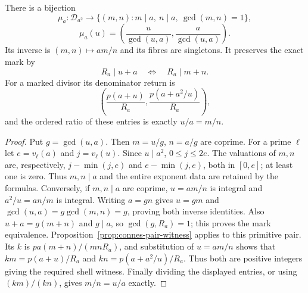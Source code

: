 \begin{proposition}
\label{prop:connes-middle-return}
There is a bijection
\[
 \mu_a:\mathcal D_{a^2}\longrightarrow
 \{(m,n):m\mid a,\ n\mid a,\ \gcd(m,n)=1\},
\]
\[
 \mu_a(u)=\left(\frac{u}{\gcd(u,a)},\frac{a}{\gcd(u,a)}\right).
\]
Its inverse is $(m,n)\mapsto am/n$ and its fibres are singletons.
It preserves the exact mark by
\[
 R_a\mid u+a\quad\Longleftrightarrow\quad R_a\mid m+n.
\]
For a marked divisor its denominator return is
\[
 \left(\frac{p(a+u)}{R_a},\frac{p(a+a^2/u)}{R_a}\right),
\]
and the ordered ratio of these entries is exactly $u/a=m/n$.
\end{proposition}
\begin{proof}
Put $g=\gcd(u,a)$.  Then $m=u/g$, $n=a/g$ are coprime.
For a prime $\ell$ let $e=v_\ell(a)$ and $j=v_\ell(u)$.
Since $u\mid a^2$, $0\le j\le2e$.  The valuations of $m,n$ are,
respectively, $j-\min(j,e)$ and $e-\min(j,e)$, both in $[0,e]$;
at least one is zero.  Thus $m,n\mid a$ and the entire exponent data
are retained by the formulas.  Conversely, if $m,n\mid a$ are coprime,
$u=am/n$ is integral and $a^2/u=an/m$ is integral.  Writing $a=gn$
gives $u=gm$ and $\gcd(u,a)=g\gcd(m,n)=g$, proving both inverse identities.
Also $u+a=g(m+n)$ and $g\mid a$, so $\gcd(g,R_a)=1$; this proves
the mark equivalence.  Proposition~\ref{prop:connes-pair-witness}
applies to this primitive pair.  Its $k$ is
$pa(m+n)/(mnR_a)$, and substitution of $u=am/n$ shows that
$km=p(a+u)/R_a$ and $kn=p(a+a^2/u)/R_a$.
Thus both are positive integers giving the required shell witness.
Finally dividing the displayed entries, or using $(km)/(kn)$, gives
$m/n=u/a$ exactly.
\end{proof}

